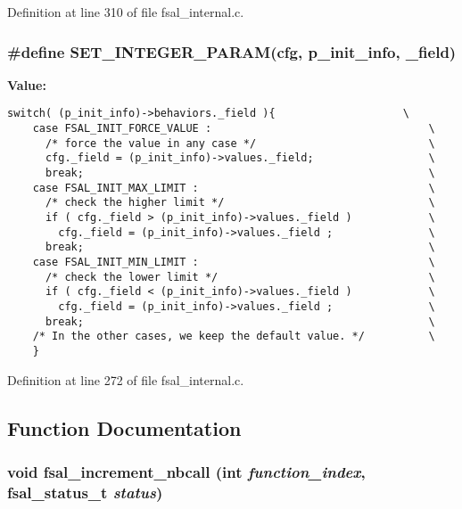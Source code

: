 Definition at line 310 of file fsal\_\-internal.c.
\subsubsection{\setlength{\rightskip}{0pt plus 5cm}\#define SET\_\-INTEGER\_\-PARAM(cfg, p\_\-init\_\-info, \_\-field)}\label{fsal__internal_8c_a1}


{\bf Value:}

\footnotesize\begin{verbatim}switch( (p_init_info)->behaviors._field ){                    \
    case FSAL_INIT_FORCE_VALUE :                                  \
      /* force the value in any case */                           \
      cfg._field = (p_init_info)->values._field;                  \
      break;                                                      \
    case FSAL_INIT_MAX_LIMIT :                                    \
      /* check the higher limit */                                \
      if ( cfg._field > (p_init_info)->values._field )            \
        cfg._field = (p_init_info)->values._field ;               \
      break;                                                      \
    case FSAL_INIT_MIN_LIMIT :                                    \
      /* check the lower limit */                                 \
      if ( cfg._field < (p_init_info)->values._field )            \
        cfg._field = (p_init_info)->values._field ;               \
      break;                                                      \
    /* In the other cases, we keep the default value. */          \
    }
\end{verbatim}\normalsize 


Definition at line 272 of file fsal\_\-internal.c.

\subsection{Function Documentation}
\subsubsection{\setlength{\rightskip}{0pt plus 5cm}void fsal\_\-increment\_\-nbcall (int {\em function\_\-index}, fsal\_\-status\_\-t {\em status})}\label{fsal__internal_8c_a14}


